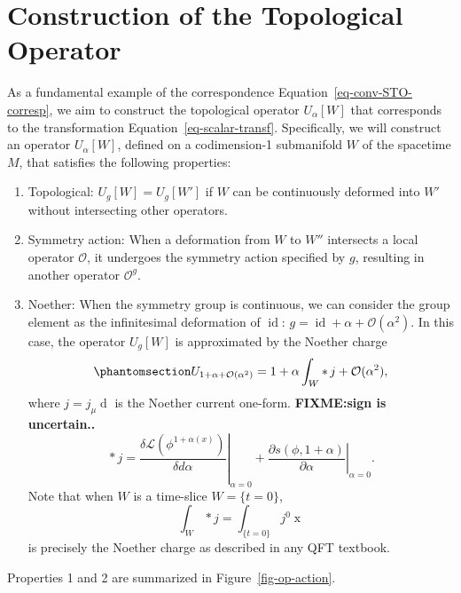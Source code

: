 \documentclass[
  letterpaper,
  DIV=11,
  numbers=noendperiod]{scrreport}
\providecommand{\tightlist}{%
  \setlength{\itemsep}{0pt}\setlength{\parskip}{0pt}}\usepackage{longtable,booktabs,array}
\DeclareMathOperator{\id}{id}
\newcommand{\stdim}{D}
\begin{document}
\section{Construction of the Topological
Operator}\label{construction-of-the-topological-operator}

As a fundamental example of the correspondence
Equation~\ref{eq-conv-STO-corresp}, we aim to construct the topological
operator \(U_\alpha[W]\) that corresponds to the transformation
Equation~\ref{eq-scalar-transf}. Specifically, we will construct an
operator \(U_\alpha[W]\), defined on a codimension-1 submanifold \(W\)
of the spacetime \(M\), that satisfies the following properties:

\begin{tcolorbox}[enhanced jigsaw, opacityback=0, colback=white, colframe=quarto-callout-important-color-frame, title=\textcolor{quarto-callout-important-color}{\faExclamation}\hspace{0.5em}{Properties of the Symmetry Topological Operator}, breakable, coltitle=black, arc=.35mm, opacitybacktitle=0.6, bottomrule=.15mm, bottomtitle=1mm, left=2mm, toprule=.15mm, titlerule=0mm, rightrule=.15mm, leftrule=.75mm, toptitle=1mm, colbacktitle=quarto-callout-important-color!10!white]

\begin{enumerate}
\def\labelenumi{\arabic{enumi}.}
\tightlist
\item
  Topological: \(U_g[W] = U_g[W']\) if \(W\) can be continuously
  deformed into \(W'\) without intersecting other operators.
\item
  Symmetry action: When a deformation from \(W\) to \(W''\) intersects a
  local operator \(\mathcal{O}\), it undergoes the symmetry action
  specified by \(g\), resulting in another operator \(\mathcal{O}^g\).
\item
  Noether: When the symmetry group is continuous, we can consider the
  group element as the infinitesimal deformation of \(\id\):
  \(g = \id + \alpha + \mathcal{O}(\alpha^2)\). In this case, the
  operator \(U_g[W]\) is approximated by the Noether charge
  \begin{equation}\phantomsection\label{eq-Noether-approx}{
   U_{1+\alpha+\mathcal{O}(\alpha^2)} = 1 + \alpha \int_W \mathop{*}j +\mathcal{O}(\alpha^2),
   }\end{equation} where \(j = j_\mu\mathop{dx^\mu}\) is the Noether
  current one-form. \textbf{FIXME:sign is uncertain..} \[
   \mathop{*}j = \left.\frac{\delta\mathcal{L}(\phi^{1+\alpha(x)})}{\delta d\alpha}\right|_{\alpha=0} + \left.\frac{\partial s(\phi, 1+ \alpha)}{\partial \alpha}\right|_{\alpha=0}.
   \] Note that when \(W\) is a time-slice \(W=\{t=0\}\), \[
  \int_W \mathop{*} j = \int_{\{t=0\}} j^0 \mathop{d^{\stdim-1}x}
  \] is precisely the Noether charge as described in any QFT textbook.
\end{enumerate}

Properties 1 and 2 are summarized in Figure~\ref{fig-op-action}.

\end{tcolorbox}
\end{document}
